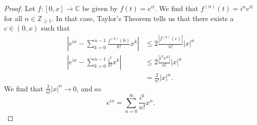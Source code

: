 \documentclass[a4paper, openany]{memoir}
\theoremstyle{definition}
\theoremstyle{plain}
\begin{document}
\begin{proof}
Let $f: [0, x] \to \mathbb{C}$ be given by $f(t) = e^{it}$. We find that $f^{(n)}(t) = i^n e^{it}$ for all $n \in \mathbb{Z}_{\geqslant 1}$. In that case, Taylor's Theorem tells us that there exists a $c \in (0, x)$ such that
\begin{align*}
    \left|e^{ix} - \sum_{k=0}^{n-1} \frac{f^{(k)}(0)}{k!} x^k \right| &\leqslant 2 \frac{|f^{(n)}(c)|}{n!} |x|^n \\
    \left|e^{ix} - \sum_{k=0}^{n-1} \frac{i^k}{k!} x^k\right| &\leqslant 2\frac{|i^n e^{it}|}{n!} |x|^n \\
    &= \frac{2}{n!} |x|^n.
\end{align*}
We find that $\frac{2}{n!} |x|^n \to 0$, and so
\[e^{ix} = \sum_{n=0}^{\infty} \frac{i^k}{n!} x^n.\]
\end{proof}
\end{document}
